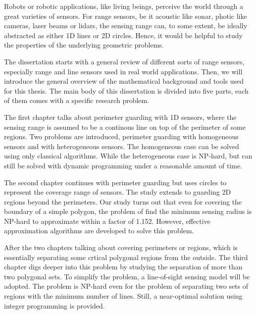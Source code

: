 \begin{my_abstract}

Robots or robotic applications, like living beings, perceive the world through
a great varieties of sensors.
For range sensors, be it acoustic like sonar, photic like cameras, laser beams or lidars, 
the sensing range can, to some extent, be ideally abstracted as either 1D lines or 2D circles.
Hence, it would be helpful to study the properties of the underlying geometric problems.


The dissertation starts with a general review of different sorts of range sensors, 
especially range and line sensors used in real world applications. 
Then, we will introduce the general overview of the mathematical background and tools used for this thesis. 
The main body of this dissertation is divided into five parts, each of them comes with 
a specific research problem. 

The first chapter talks about perimeter guarding with 1D sensors, where the sensing range 
is assumed to be a continous line on top of the perimeter of some regions. Two problems are 
introduced, perimeter guarding with homogeneous sensors and with heterogeneous sensors. 
The homogeneous case can be solved using only classical algorithms. 
While the heterogeneous case is NP-hard, but can still be solved with dynamic programming under a reasonable
amount of time. 

The second chapter continues with perimeter guarding but uses circles to represent the 
coverage range of sensors. The study extends to guarding 2D regions beyond the perimeters. 
Our study turns out that even for covering the boundary of a simple polygon, 
the problem of find the minimum sensing radius is NP-hard to approximate within a factor of 1.152. 
However, effective approximation algorithms are developed to solve this problem. 

After the two chapters talking about covering perimeters or regions, which is essentially separating 
some crtical polygonal regions from the outside. 
The third chapter digs deeper into this problem by studying the separation of more than two polygonal sets. 
To simplify the problem, a line-of-sight sensing model will be adopted. 
The problem is NP-hard even for the problem of separating two sets of regions with the minimum number of lines.
Still, a near-optimal solution using integer programming is provided.


\end{my_abstract}
